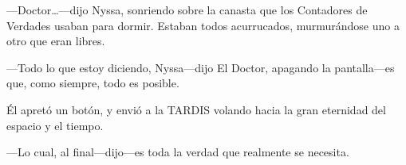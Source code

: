 ---Doctor\ldots{}---dijo Nyssa, sonriendo sobre la canasta que los
Contadores de Verdades usaban para dormir. Estaban todos acurrucados,
murmurándose uno a otro que eran libres.

---Todo lo que estoy diciendo, Nyssa---dijo El Doctor, apagando la
pantalla---es que, como siempre, todo es posible.

Él apretó un botón, y envió a la TARDIS volando hacia la gran eternidad
del espacio y el tiempo.

---Lo cual, al final---dijo---es toda la verdad que realmente se
necesita.